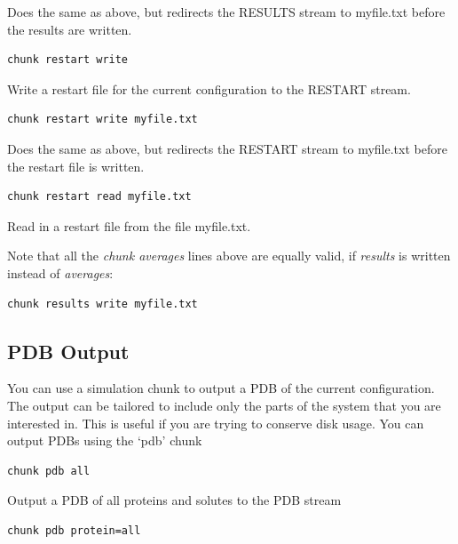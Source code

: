 \documentclass[letterpaper,10pt,english]{sphinxmanual}
\begin{document}
Does the same as above, but redirects the RESULTS stream to myfile.txt before the results are written.

\begin{Verbatim}[commandchars=\\\{\}]
chunk restart write
\end{Verbatim}

Write a restart file for the current configuration to the RESTART stream.

\begin{Verbatim}[commandchars=\\\{\}]
chunk restart write myfile.txt
\end{Verbatim}

Does the same as above, but redirects the RESTART stream to myfile.txt before the restart file is written.

\begin{Verbatim}[commandchars=\\\{\}]
chunk restart read myfile.txt
\end{Verbatim}

Read in a restart file from the file myfile.txt.

Note that all the \emph{chunk averages} lines above are equally valid, if \emph{results} is written instead of \emph{averages}:

\begin{Verbatim}[commandchars=\\\{\}]
chunk results write myfile.txt
\end{Verbatim}


\subsection{PDB Output}
\label{protoms:pdb-output}
You can use a simulation chunk to output a PDB of the current configuration. The output can be tailored to include only the parts of the system that you are interested in. This is useful if you are trying to conserve disk usage. You can output PDBs using the ‘pdb’ chunk

\begin{Verbatim}[commandchars=\\\{\}]
chunk pdb all
\end{Verbatim}

Output a PDB of all proteins and solutes to the PDB stream

\begin{Verbatim}[commandchars=\\\{\}]
chunk pdb protein=all
\end{Verbatim}
\end{document}
